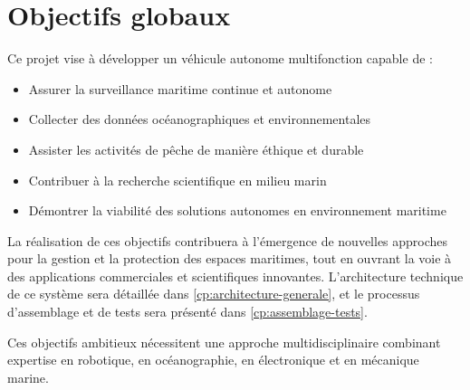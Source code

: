 {\section{Objectifs globaux}
Ce projet vise à développer un véhicule autonome multifonction capable de :
\begin{itemize}
    \setlength{\itemsep}{.375em}
    \item Assurer la surveillance maritime continue et autonome
    \item Collecter des données océanographiques et environnementales
    \item Assister les activités de pêche de manière éthique et durable
    \item Contribuer à la recherche scientifique en milieu marin
    \item Démontrer la viabilité des solutions autonomes en environnement maritime
\end{itemize}

La réalisation de ces objectifs contribuera à l'émergence de nouvelles approches pour la gestion et la protection des espaces maritimes, tout en ouvrant la voie à des applications commerciales et scientifiques innovantes. L'\gls{architecture} technique de ce système sera détaillée dans \autoref{cp:architecture-generale}, et le processus d'\gls{assemblage} et de tests sera présenté dans \autoref{cp:assemblage-tests}.

\begin{block}[tip]
Ces objectifs ambitieux nécessitent une approche multidisciplinaire combinant expertise en robotique, en océanographie, en électronique et en mécanique marine.
\end{block}

} 